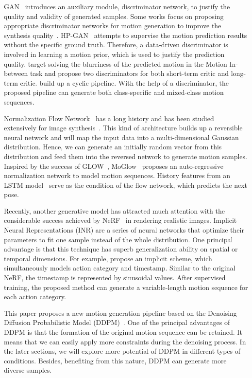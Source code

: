 GAN~\citep{goodfellow2014generative} introduces an auxiliary module, discriminator network, to justify the quality and validity of generated samples.
Some works focus on proposing appropriate discriminator networks for motion generation to improve the synthesis quality~\citep{barsoum2018hp,harvey2020robust,wang2020learning}. HP-GAN~\citep{barsoum2018hp} attempts to supervise the motion prediction results without the specific ground truth. Therefore, a data-driven discriminator is involved in learning a motion prior, which is used to justify the prediction quality. \cite{harvey2020robust} target solving the blurriness of the predicted motion in the Motion In-between task and propose two discriminators for both short-term critic and long-term critic. \cite{wang2020learning} build up a cyclic pipeline. With the help of a discriminator, the proposed pipeline can generate both class-specific and mixed-class motion sequences.

Normalization Flow Network~\citep{dinh2014nice} has a long history and has been studied extensively for image synthesis~\citep{dinh2016density,kingma2018glow}. This kind of architecture builds up a reversible neural network and will map the input data into a multi-dimensional Gaussian distribution. Hence, we can generate an initially random vector from this distribution and feed them into the reversed network to generate motion samples. Inspired by the success of GLOW~\citep{kingma2018glow}, MoGlow~\citep{henter2020moglow} proposes an auto-regressive normalization network to model motion sequences. History features from an LSTM model~\citep{hochreiter1997long} serve as the condition of the flow network, which predicts the next pose.

Recently, another generative model has attracted much attention with the considerable success achieved by NeRF~\citep{mildenhall2020nerf, jain2021putting} in rendering realistic images. Implicit Neural Representations (INR) are a series of neural networks that optimize their parameters to fit one sample instead of the whole distribution. One principal advantage is that this technique has superb generalization ability on spatial or temporal dimensions. For example, \cite{cervantes2022implicit} propose an implicit scheme, which simultaneously models action category and timestamp. Similar to the original NeRF, the timestamp is represented by sinusoidal values. After supervised training, the proposed method can generate a variable-length motion sequence for each action category.   

This paper proposes a new motion generation pipeline based on the Denoising Diffusion Probabilistic Model (DDPM)~\citep{ho2020denoising}. One of the principal advantages of DDPM is that the formation of the original motion sequence can be retained. It means that we can easily apply more constraints during the denoising process. In the later sections, we will explore more potential of DDPM in different types of conditions. Besides, benefiting from this nature, DDPM can generate more diverse samples.

